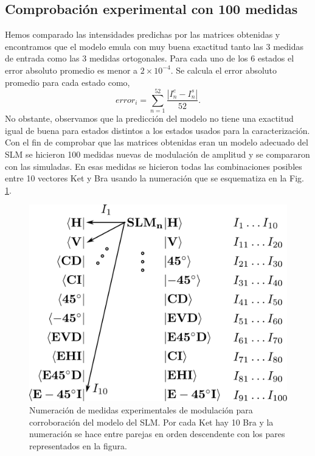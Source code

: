 \subsection{Comprobación experimental con 100 medidas}
\label{sec:exp_validation}
Hemos comparado las intensidades predichas por las matrices obtenidas
y encontramos que el modelo emula con muy buena exactitud tanto las 3 medidas
de entrada como las 3 medidas ortogonales. Para cada uno de los 6
estados el error absoluto promedio es menor a $2\times10^{-4}$.  Se
calcula el error absoluto promedio para cada estado como,
\begin{equation*}
error_i = \sum_{n=1}^{52}\frac{|I_n^e-I_n^s|}{52}.
\end{equation*}   
No obstante, observamos que la predicción del modelo no tiene una
exactitud igual de buena para estados distintos a los estados usados
para la caracterización. 
Con el fin de comprobar que las matrices obtenidas eran un modelo adecuado
del SLM se hicieron 100 medidas nuevas de modulación de amplitud y se
compararon con las simuladas. En esas medidas se hicieron todas las combinaciones
posibles entre 10 vectores Ket y Bra usando la 
numeración que se esquematiza en la Fig. \ref{fig:braket_100_notation}.
\begin{figure}[h!]
\centering
\includegraphics[scale=.4]{brakets.pdf}
\caption[Numeración de medidas experimentales de modulación para
corroboración del modelo de SLM]{Numeración de medidas experimentales de modulación para
corroboración del modelo del SLM. Por cada Ket hay 10 Bra y la
numeración se hace entre parejas en orden descendente con los pares
representados en la figura. }
\label{fig:braket_100_notation}
\end{figure}
